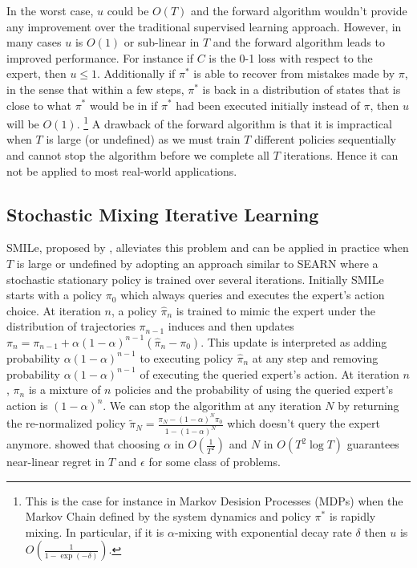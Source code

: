 \documentclass[twoside]{article}
\begin{document}
In the worst case, $u$ could be $O(T)$ and the forward algorithm wouldn't provide any improvement over the traditional supervised learning approach. However, in many cases $u$ is $O(1)$ or sub-linear in $T$ and the forward algorithm leads to improved performance. For instance if $C$ is the 0-1 loss with respect to the expert, then $u \leq 1$. Additionally if $\pi^*$ is able to recover from mistakes made by $\pi$, in the sense that within a few steps, $\pi^*$ is back in a distribution of states that is close to what $\pi^*$ would be in if $\pi^*$ had been executed initially instead of $\pi$, then $u$ will be $O(1)$. \footnote{This is the case for instance in Markov Desision Processes (MDPs) when the Markov Chain defined by the system dynamics and policy $\pi^*$ is rapidly mixing. In particular, if it is $\alpha$-mixing with exponential decay rate $\delta$ then $u$ is $O(\frac{1}{1-\exp(-\delta)})$.} A drawback of the forward algorithm is that it is impractical when $T$ is large (or undefined) as we must train $T$ different policies sequentially and cannot stop the algorithm before we complete all $T$ iterations. Hence it can not be applied to most real-world applications.%
%
\subsection{Stochastic Mixing Iterative Learning}
%
SMILe, proposed by \citet{Ross10},  alleviates this problem and can be applied in practice when $T$ is large or undefined by adopting an approach similar to SEARN \citep{Daume09} where a stochastic stationary policy is trained over several iterations. Initially SMILe starts with a policy $\pi_0$ which always queries and executes the expert's action choice. At iteration $n$, a policy $\hat{\pi}_n$ is trained to mimic the expert under the distribution of trajectories $\pi_{n-1}$ induces and then updates $\pi_{n} = \pi_{n-1} + \alpha(1-\alpha)^{n-1}(\hat{\pi}_n - \pi_0)$. This update is interpreted as adding probability $\alpha(1-\alpha)^{n-1}$ to executing policy $\hat{\pi}_n$ at any step and removing probability $\alpha(1-\alpha)^{n-1}$ of executing the queried expert's action. At iteration $n$, $\pi_n$ is a mixture of $n$ policies and the probability of using the queried expert's action is $(1-\alpha)^{n}$. We can stop the algorithm at any iteration $N$ by returning the re-normalized policy $\tilde{\pi}_N = \frac{\pi_N - (1-\alpha)^N \pi_0}{1-(1-\alpha)^N}$ which doesn't query the expert anymore. \citet{Ross10} showed that choosing $\alpha$ in $O(\frac{1}{T^2})$ and $N$ in $O(T^2 \log T)$ guarantees near-linear regret in $T$ and $\epsilon$ for some class of problems. %
%
\end{document}
